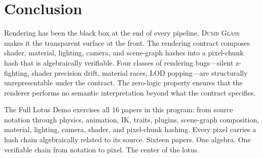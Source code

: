 \documentclass[sigconf,nonacm]{acmart}
\newcommand{\dumbglass}{\textsc{Dumb Glass}}
\begin{document}
\section{Conclusion}
\label{sec:conclusion}

Rendering has been the black box at the end of every pipeline.
\dumbglass{} makes it the transparent surface at the front.
The rendering contract composes shader, material, lighting,
camera, and scene-graph hashes into a pixel-chunk hash that is
algebraically verifiable. Four classes of rendering bugs---silent
z-fighting, shader precision drift, material races, LOD
popping---are structurally unrepresentable under the contract.
The zero-logic property ensures that the renderer performs no
semantic interpretation beyond what the contract specifies.

The Full Lotus Demo exercises all 16 papers in this program:
from source notation through physics, animation, IK, traits,
plugins, scene-graph composition, material, lighting, camera,
shader, and pixel-chunk hashing. Every pixel carries a hash
chain algebraically related to its source. Sixteen papers.
One algebra. One verifiable chain from notation to pixel.
The center of the lotus.



\end{document}
